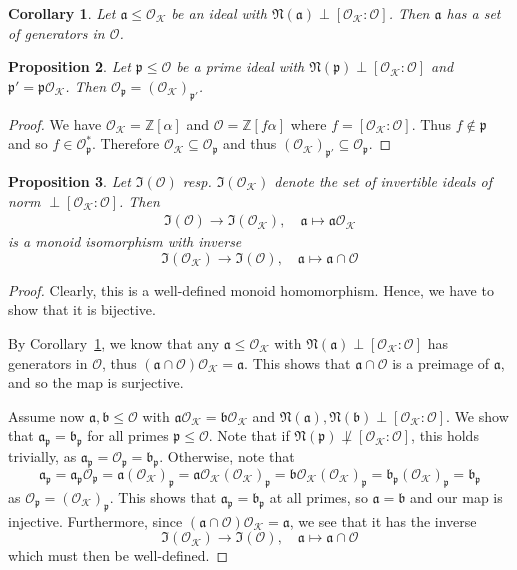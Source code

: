 \documentclass{scrartcl}
\newcommand{\N}{\mathbb{N}}
\newcommand{\Z}{\mathbb{Z}}
\newcommand{\K}{\mathcal{K}}
\newcommand{\p}{\mathfrak{p}}
\renewcommand{\a}{\mathfrak{a}}
\renewcommand{\b}{\mathfrak{b}}
\renewcommand{\O}{\mathcal{O}}
\renewcommand{\N}{\mathfrak{N}}
\newtheorem{prop}{Proposition}[section]
\newtheorem{corollary}[prop]{Corollary}
\theoremstyle{definition}
\begin{document}
\begin{corollary}
    \label{prop:generators_in_order}
    Let $\a \leq \O_\K$ be an ideal with $\N(\a) \perp [\O_\K : \O]$. Then $\a$ has a set of generators in $\O$.
\end{corollary}
\begin{prop}
    Let $\p \leq \O$ be a prime ideal with $\N(\p) \perp [\O_\K : \O]$ and $\p' = \p\O_\K$.
    Then $\O_\p = (\O_\K)_{\p'}$.
\end{prop}
\begin{proof}
    We have $\O_\K = \Z[\alpha]$ and $\O = \Z[f\alpha]$ where $f = [\O_\K : \O]$.
    Thus $f \notin \p$ and so $f \in \O_\p^*$.
    Therefore $\O_\K \subseteq \O_\p$ and thus $(\O_\K)_{\p'} \subseteq \O_\p$.
\end{proof}
\begin{prop}
    Let $\mathfrak{I}(\O)$ resp. $\mathfrak{I}(\O_\K)$ denote the set of invertible ideals of norm $\perp [\O_\K : \O]$.
    Then
    \begin{align*}
        \mathfrak{I}(\O) \to \mathfrak{I}(\O_\K), \quad \a \mapsto \a\O_\K
    \end{align*}
    is a monoid isomorphism with inverse
    \begin{equation*}
        \mathfrak{I}(\O_\K) \to \mathfrak{I}(\O), \quad \a \mapsto \a \cap \O
    \end{equation*}
\end{prop}
\begin{proof}
    Clearly, this is a well-defined monoid homomorphism.
    Hence, we have to show that it is bijective.

    By Corollary~\ref{prop:generators_in_order}, we know that any $\a \leq \O_\K$ with $\N(\a) \perp [\O_\K : \O]$ has generators in $\O$, thus $(\a \cap \O)\O_\K = \a$.
    This shows that $\a \cap \O$ is a preimage of $\a$, and so the map is surjective. 

    Assume now $\a, \b \leq \O$ with $\a\O_\K = \b\O_\K$ and $\N(\a), \N(\b) \perp [\O_\K : \O]$.
    We show that $\a_\p = \b_\p$ for all primes $\p \leq \O$.
    Note that if $\N(\p) \not\perp [\O_\K : \O]$, this holds trivially, as $\a_\p = \O_\p = \b_\p$.
    Otherwise, note that
    \begin{equation*}
        \a_\p = \a_\p \O_\p = \a (\O_\K)_\p = \a\O_\K(\O_\K)_\p = \b\O_\K(\O_\K)_\p = \b_\p (\O_\K)_\p = \b_\p
    \end{equation*}
    as $\O_\p = (\O_\K)_\p$.
    This shows that $\a_\p = \b_\p$ at all primes, so $\a = \b$ and our map is injective.
    Furthermore, since $(\a \cap \O)\O_\K = \a$, we see that it has the inverse
    \begin{equation*}
        \mathfrak{I}(\O_\K) \to \mathfrak{I}(\O), \quad \a \mapsto \a \cap \O
    \end{equation*}
    which must then be well-defined.
\end{proof}
\end{document}
